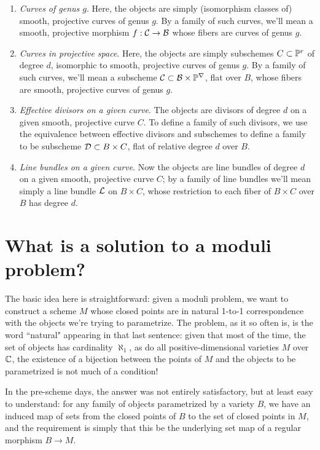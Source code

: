 \begin{enumerate}\label{list of moduli problems}
\item \emph{Curves of genus $g$}. Here, the objects are simply (isomorphism classes of) smooth, projective curves of genus $g$. By a family of such curves, we'll mean a smooth, projective morphism $f : \cal C \to B$ whose fibers are  curves of genus $g$.

\item \emph{Curves in projective space}. Here, the objects are simply subschemes $C \subset {\mathbb P}^r$ of degree $d$, isomorphic to smooth, projective curves of genus $g$. By a family of such curves, we'll mean a subscheme $\cal C \subset B \times {\mathbb P}^r$, flat over $B$,  whose fibers are smooth, projective curves of genus $g$.

\item \emph{Effective divisors on a given curve}. The objects are divisors of degree $d$ on a given smooth, projective curve $C$. To define a family of such divisors, we use the equivalence between effective divisors and subschemes to define a family to be subscheme ${\cal D} \subset B \times C$, flat of relative degree $d$ over $B$.


\item \emph{Line bundles on a given curve}. Now the objects are line bundles of degree $d$ on a given smooth, projective curve $C$; by a family of line bundles we'll mean simply a line bundle ${\mathcal L}$ on $B \times C$, whose restriction to each fiber of $B \times C$ over $B$ has degree $d$.

\end{enumerate}

\section{What is a solution to a moduli problem?}

The basic idea here is straightforward: given a moduli problem, we want to construct a scheme $M$ whose closed points are in natural  1-to-1 correspondence with the objects we're trying to parametrize. The problem, as it so often is, is the word ``natural" appearing in that last sentence: given that most of the time, the set of objects has cardinality $\aleph_1$, as do all positive-dimensional varieties $M$ over ${\mathbb C}$, the existence of a bijection between the points of $M$ and the objects to be parametrized is not much of a condition!

In the pre-scheme days, the answer was not entirely satisfactory, but at least easy to understand:  for any family of objects parametrized by a variety $B$, we have an induced map of sets from the closed points of $B$ to the set of closed points in $M$, and the requirement is simply that this be the underlying set map of a regular morphism $B \to M$.


